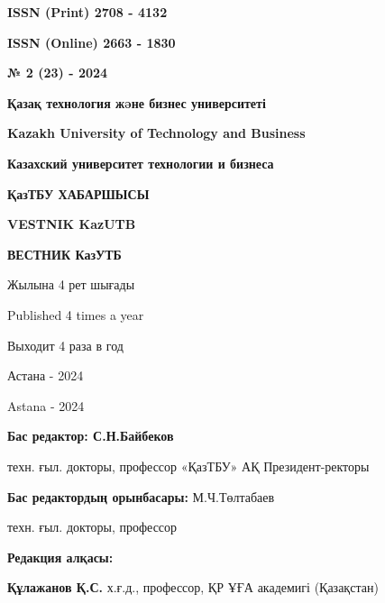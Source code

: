 \begin{flushright}
{\bfseries ISSN (Print) 2708 - 4132}

{\bfseries ISSN (Online) 2663 - 1830}

\vspace{1cm}

{\bfseries № 2 (23) - 2024}
\end{flushright}

\vfill

\begin{center}
{\bfseries \large Қазақ технология жəне бизнес университеті}

\vspace{0.3cm}

{\bfseries \large Kazakh University of Technology and Business}

\vspace{0.3cm}

{\bfseries \large Казахский университет технологии и бизнеса}

\vfill

{\bfseries \huge ҚазТБУ ХАБАРШЫСЫ}

\vspace{0.5cm}

{\bfseries \huge VESTNIK KazUTB}

\vspace{0.5cm}

{\bfseries \huge ВЕСТНИК КазУТБ}

\vfill

Жылына 4 рет шығады

Published 4 times a year

Выходит 4 раза в год

\vfill

Астана - 2024

Astana - 2024
\end{center}

\pagebreak

\begin{center}
{\bfseries Бас редактор: С.Н.Байбеков}

техн. ғыл. докторы, профессор «ҚазТБУ» АҚ Президент-ректоры

{\bfseries Бас редактордың орынбасары:} М.Ч.Төлтабаев

техн. ғыл. докторы, профессор

{\bfseries Редакция алқасы:}
\end{center}

{\bfseries Құлажанов Қ.С.} х.ғ.д., профессор, ҚР ҰҒА академигі (Қазақстан)

